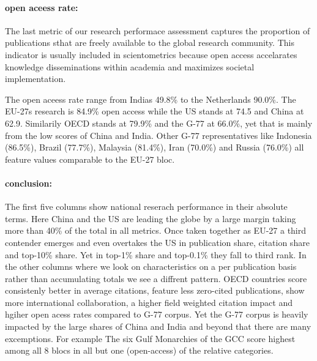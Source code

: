 \documentclass{article}
\begin{document}
\paragraph{open aceess rate:} The last metric of our research performace assessment captures the proportion of publications sthat are freely available to the global research community. This indicator is usually included in scientometrics because open access accelarates knowledge disseminations within academia and maximizes societal implementation. 

The open aceess rate range from Indias 49.8\% to the Netherlands 90.0\%. The EU-27s research is 84.9\% open access while the US stands at 74.5 and China at 62.9. Similarily OECD stands at 79.9\% and the G-77 at 66.0\%, yet that is mainly from the low scores of China and India. Other G-77 representatives like Indonesia (86.5\%), Brazil (77.7\%), Malaysia (81.4\%), Iran (70.0\%) and Russia (76.0\%) all feature values comparable to the EU-27 bloc.

\paragraph{conclusion:} The first five columns show national reserach performance in their absolute terms. Here China and the US are leading the globe by a large margin taking more than 40\% of the total in all metrics. Once taken together as EU-27 a third contender emerges and even overtakes the US in publication share, citation share and top-10\% share. Yet in top-1\% share and top-0.1\% they fall to third rank. In the other columns where we look on characteristics on a per publication basis rather than accumulating totals we see a diffrent pattern. OECD countries score consistenly better in average citations, feature less zero-cited publications, show more international collaboration, a higher field weighted citation impact and hgiher open acess rates compared to G-77 corpus. Yet the G-77 corpus is heavily impacted by the large shares of China and India and beyond that there are many excemptions. For example The six Gulf Monarchies of the GCC score highest among all 8 blocs in all but one (open-access) of the relative categories. 
\end{document}
